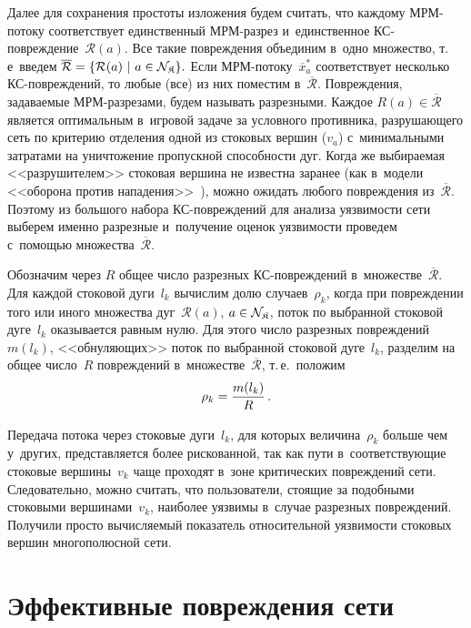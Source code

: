 \begin{multicols}{2}
Далее для сохранения простоты изложения будем считать, что 
каждому МРМ-по\-то\-ку соответствует единственный МРМ-раз\-рез и~единственное 
КС-по\-вреж\-де\-ние~$\mathcal{R}(a)$.
Все такие по\-вреж\-де\-ния объединим в~одно множество, т.\,е\
 введем  $\overline{\mathcal{R}} \hm= \{ \mathcal{R}(a)\ | \ a \hm\in 
 \mathcal{N}_{\SK}\}.$
Если МРМ-по\-то\-ку~$\overline {x}_a^*$ соответствует несколько КС-по\-вреж\-де\-ний, 
то любые (все) из них по\-мес\-тим в~$\overline{\mathcal{R}}$. Повреждения, за\-да\-ва\-емые 
МРМ-раз\-ре\-за\-ми, будем называть разрезными. Каждое  
$R(a) \in\overline{\mathcal{R}} $ является оптимальным в~игровой 
задаче за условного противника, разрушающего сеть по критерию отделения 
одной из стоковых вершин ($v_a$) с~минимальными затратами на 
уничтожение пропускной способности дуг. Когда же выбираемая 
<<разрушителем>> стоковая вершина не известна заранее (как в~модели <<оборона 
против нападения>>~\cite{ germ}), можно ожидать любого по\-вреж\-де\-ния 
из~$\overline{\mathcal{R}}$. Поэтому из большого набора КС-по\-вреж\-де\-ний 
для анализа уязвимости сети выберем именно разрезные и~получение оценок 
уязвимости проведем с~помощью множества~$\overline{\mathcal{R}}$.

Обозначим через $R$ общее число разрезных КС-по\-вреж\-де\-ний 
в~множестве~$\overline{\mathcal{R}}$.
Для каждой стоковой дуги~$l_k$ вычислим долю случаев~$\rho_k$, когда при 
по\-вреж\-де\-нии того или иного множества дуг~$\mathcal{R}(a)$, 
$a \hm\in \mathcal{N}_{\SK}$, поток по выбранной стоковой дуге~$l_k$ 
оказывается равным нулю. Для этого число разрезных по\-вреж\-де\-ний~$m(l_k)$, 
<<об\-ну\-ля\-ющих>> поток по выбранной стоковой дуге~$l_k$, разделим на общее чис\-ло~$R$ 
по\-вреж\-де\-ний в~множестве~$\overline{\mathcal{R}}$, т.\,е.\ положим
$$
 \rho_k = \displaystyle\frac{\displaystyle m(l_k)\mathstrut}{\displaystyle R\mathstrut}\,.
 $$

Передача потока через стоковые дуги~$l_k$, для которых величина~$\rho_k$ 
больше чем у~других, представляется более рискованной, так как пути в~соответствующие 
стоковые вершины~$v_k$ чаще проходят в~зоне критических по\-вреж\-де\-ний сети. 
Следовательно, можно считать, что пользователи, стоящие за подобными 
стоковыми вершинами~$v_k$, наиболее уязвимы в~случае разрезных по\-вреж\-де\-ний. 
Получили просто вычисляемый показатель относительной уязвимости стоковых 
вершин многополюсной сети. 

\vspace*{-4pt}

\section{Эффективные повреждения сети}


\end{multicols}

